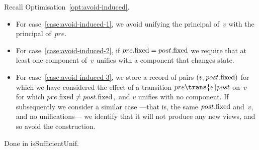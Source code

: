 \begin{opt}
Recall Optimisation~\ref{opt:avoid-induced}.  
\begin{itemize}
\item For case~\ref{case:avoid-induced-1}, we avoid unifying the principal
  of~$v$ with the principal of~$pre$.

\item For case~\ref{case:avoid-induced-2}, if $pre.\mathrm{fixed} = post.\mathrm{fixed}$ we
  require that at least one component of~$v$ unifies with a component that
  changes state.

\item For case~\ref{case:avoid-induced-3}, we store a record of pairs
  $(v, post.\mathrm{fixed})$ for which we have considered the effect of a transition
  $pre \trans{e} post$ on~$v$ for which $pre.\mathrm{fixed} \ne post.\mathrm{fixed}$,\,
  and $v$
  unifies with no component.
%
  If subsequently we consider a similar case ---that is, the same
  $post.\mathrm{fixed}$ and~$v$, and no unifications--- we identify that it will not
  produce any new views, and so avoid the construction.
\end{itemize}
\end{opt}


\begin{impNote}
Done in isSufficientUnif. 
\end{impNote}

